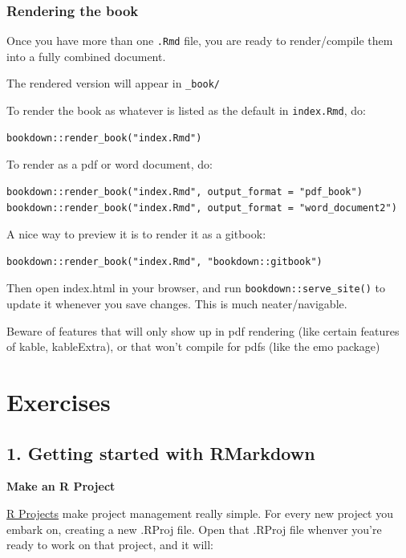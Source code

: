 \documentclass[
  12pt,
  oneside]{book}
\numberwithin{figure}{chapter}
\begin{document}
\hypertarget{rendering-the-book}{%
\subsection{Rendering the book}\label{rendering-the-book}}

Once you have more than one \texttt{.Rmd} file, you are ready to render/compile them into a fully combined document.

The rendered version will appear in \texttt{\_book/}

To render the book as whatever is listed as the default in \texttt{index.Rmd}, do:

\begin{verbatim}
bookdown::render_book("index.Rmd")
\end{verbatim}

To render as a pdf or word document, do:

\begin{verbatim}
bookdown::render_book("index.Rmd", output_format = "pdf_book")
bookdown::render_book("index.Rmd", output_format = "word_document2")
\end{verbatim}

A nice way to preview it is to render it as a gitbook:

\begin{verbatim}
bookdown::render_book("index.Rmd", "bookdown::gitbook")
\end{verbatim}

Then open index.html in your browser, and run \texttt{bookdown::serve\_site()} to update it whenever you save changes. This is much neater/navigable.

Beware of features that will only show up in pdf rendering (like certain features of kable, kableExtra), or that won't compile for pdfs (like the emo package)

\hypertarget{exercises}{%
\chapter{Exercises}\label{exercises}}

\hypertarget{ex1}{%
\section{1. Getting started with RMarkdown}\label{ex1}}

\textbf{Make an R Project}

\href{https://support.rstudio.com/hc/en-us/articles/200526207-Using-Projects}{R Projects} make project management really simple. For every new project you embark on, creating a new .RProj file.
Open that .RProj file whenver you're ready to work on that project, and it will:
\end{document}

